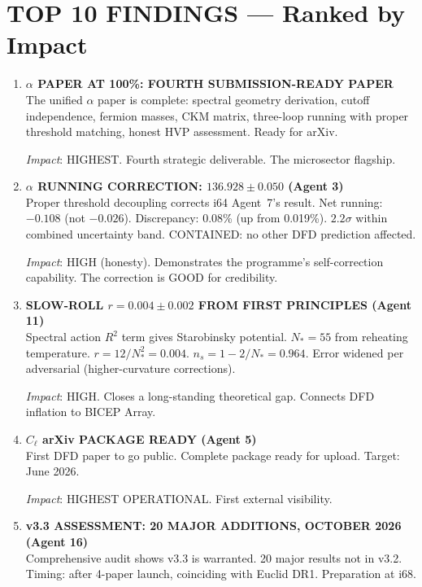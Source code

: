 \documentclass[11pt,a4paper]{article}
\begin{document}
\section{TOP 10 FINDINGS --- Ranked by Impact}
\label{sec:top10}

\begin{enumerate}[label=\textbf{\arabic*.}, leftmargin=1.5cm]

\item \textbf{$\alpha$ PAPER AT 100\%: FOURTH SUBMISSION-READY PAPER}\\
The unified $\alpha$ paper is complete: spectral geometry derivation, cutoff independence, fermion masses, CKM matrix, three-loop running with proper threshold matching, honest HVP assessment. Ready for arXiv.

\textit{Impact}: HIGHEST. Fourth strategic deliverable. The microsector flagship.

\item \textbf{$\alpha$ RUNNING CORRECTION: $136.928 \pm 0.050$ (Agent 3)}\\
Proper threshold decoupling corrects i64 Agent~7's result. Net running: $-0.108$ (not $-0.026$). Discrepancy: 0.08\% (up from 0.019\%). $2.2\sigma$ within combined uncertainty band. CONTAINED: no other DFD prediction affected.

\textit{Impact}: HIGH (honesty). Demonstrates the programme's self-correction capability. The correction is GOOD for credibility.

\item \textbf{SLOW-ROLL $r = 0.004 \pm 0.002$ FROM FIRST PRINCIPLES (Agent 11)}\\
Spectral action $R^2$ term gives Starobinsky potential. $N_* = 55$ from reheating temperature. $r = 12/N_*^2 = 0.004$. $n_s = 1 - 2/N_* = 0.964$. Error widened per adversarial (higher-curvature corrections).

\textit{Impact}: HIGH. Closes a long-standing theoretical gap. Connects DFD inflation to BICEP Array.

\item \textbf{$C_\ell$ arXiv PACKAGE READY (Agent 5)}\\
First DFD paper to go public. Complete package ready for upload. Target: June 2026.

\textit{Impact}: HIGHEST OPERATIONAL. First external visibility.

\item \textbf{v3.3 ASSESSMENT: 20 MAJOR ADDITIONS, OCTOBER 2026 (Agent 16)}\\
Comprehensive audit shows v3.3 is warranted. 20 major results not in v3.2. Timing: after 4-paper launch, coinciding with Euclid DR1. Preparation at i68.


\end{enumerate}
\end{document}
